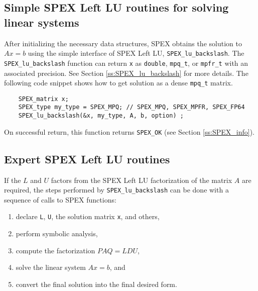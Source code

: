 \documentclass[12pt]{report}
\theoremstyle{definition}
\begin{document}
\cprotect\subsection{Simple SPEX Left LU routines for solving linear systems}
\label{s:Using:simple}

After initializing the necessary data structures, SPEX obtains the solution
to $Ax=b$ using the simple interface of SPEX Left LU, \verb|SPEX_lu_backslash|.  The 
\newline \verb|SPEX_lu_backslash| function can return \verb|x| as \verb|double|,
\verb|mpq_t|, or \verb|mpfr_t| with an associated precision.  See Section
\ref{ss:SPEX_lu_backslash} for more details.  The following code snippet shows how
to get solution as a dense \verb|mpq_t| matrix.

{\small
\begin{verbatim}
    SPEX_matrix x;
    SPEX_type my_type = SPEX_MPQ; // SPEX_MPQ, SPEX_MPFR, SPEX_FP64
    SPEX_lu_backslash(&x, my_type, A, b, option) ; \end{verbatim} }

On successful return, this function returns \verb|SPEX_OK| (see Section
\ref{ss:SPEX_info}).

\cprotect\subsection{Expert SPEX Left LU routines}
\label{s:Using:expert}

If the $L$ and $U$ factors from the SPEX Left LU factorization of the matrix $A$
are required, the steps performed by \verb|SPEX_lu_backslash| can be done with
a sequence of calls to SPEX functions:

\begin{enumerate}
\item declare \verb|L|, \verb|U|, the solution matrix \verb|x|, and others,
\item perform symbolic analysis,
\item compute the factorization $PAQ = L D U$, 
\item solve the linear system $Ax =b$, and
\item convert the final solution into the final desired form.
\end{enumerate}
\end{document}
